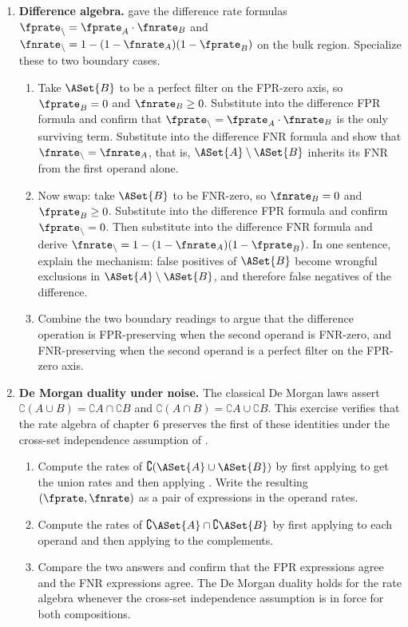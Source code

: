 \begin{enumerate}
\item \exstarstar
\label{ex:ch6-5}
\textbf{Difference algebra.}
 gave the difference rate formulas
$\fprate_\setminus = \fprate_A \cdot \fnrate_B$ and
$\fnrate_\setminus = 1 - (1 - \fnrate_A)(1 - \fprate_B)$ on the bulk
region. Specialize these to two boundary cases.
\begin{enumerate}
  \item[(a)] Take $\ASet{B}$ to be a perfect filter on the FPR-zero
    axis, so $\fprate_B = 0$ and $\fnrate_B \ge 0$. Substitute into
    the difference FPR formula and confirm that
    $\fprate_\setminus = \fprate_A \cdot \fnrate_B$ is the only
    surviving term. Substitute into the difference FNR formula and
    show that $\fnrate_\setminus = \fnrate_A$, that is, $\ASet{A}
    \setminus \ASet{B}$ inherits its FNR from the first operand alone.
  \item[(b)] Now swap: take $\ASet{B}$ to be FNR-zero, so
    $\fnrate_B = 0$ and $\fprate_B \ge 0$. Substitute into the
    difference FPR formula and confirm $\fprate_\setminus = 0$. Then
    substitute into the difference FNR formula and derive
    $\fnrate_\setminus = 1 - (1 - \fnrate_A)(1 - \fprate_B)$. In one
    sentence, explain the mechanism: false positives of $\ASet{B}$
    become wrongful exclusions in $\ASet{A} \setminus \ASet{B}$, and
    therefore false negatives of the difference.
  \item[(c)] Combine the two boundary readings to argue that the
    difference operation is FPR-preserving when the second operand
    is FNR-zero, and FNR-preserving when the second operand is a
    perfect filter on the FPR-zero axis.
\end{enumerate}

\item \exstarstar
\label{ex:ch6-6}
\textbf{De Morgan duality under noise.}
The classical De Morgan laws assert
$\complement(A \cup B) = \complement A \cap \complement B$ and
$\complement(A \cap B) = \complement A \cup \complement B$. This
exercise verifies that the rate algebra of chapter 6 preserves the
first of these identities under the cross-set independence assumption
of .
\begin{enumerate}
  \item[(a)] Compute the rates of $\complement(\ASet{A} \cup
    \ASet{B})$ by first applying  to get the
    union rates and then applying . Write
    the resulting $(\fprate, \fnrate)$ as a pair of expressions in the
    operand rates.
  \item[(b)] Compute the rates of $\complement \ASet{A} \cap
    \complement \ASet{B}$ by first applying 
    to each operand and then applying 
    to the complements.
  \item[(c)] Compare the two answers and confirm that the FPR
    expressions agree and the FNR expressions agree. The De Morgan
    duality holds for the rate algebra whenever the cross-set
    independence assumption is in force for both compositions.
\end{enumerate}


\end{enumerate}
